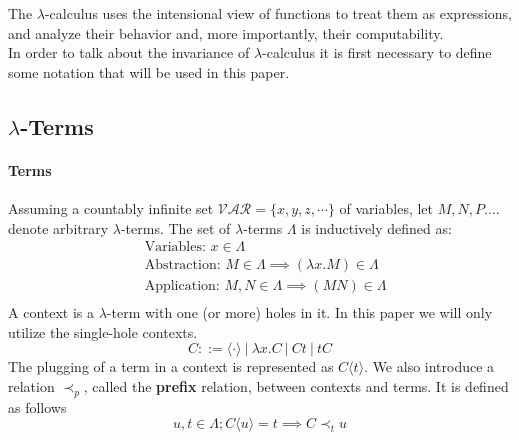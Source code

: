 \documentclass[11pt]{article}
\begin{document}
The $\lambda$-calculus uses the intensional view of functions to treat them as expressions, and analyze their behavior and, more importantly, their computability. \\
In order to talk about the invariance of $\lambda$-calculus it is first necessary to define some notation that will be used in this paper.
\subsection{$\lambda$-Terms}
\paragraph{Terms} Assuming a countably infinite set $\mathcal{VAR} = \{ x, y, z, \cdots \}$ of variables, let $M, N, P....$ denote arbitrary $\lambda$-terms. The set of $\lambda$-terms $\Lambda$ is inductively defined as:
\begin{equation*}
  \begin{split}
  & \text{Variables: } x \in \Lambda \\
  & \text{Abstraction: } M \in \Lambda \implies ( \lambda x.M ) \in \Lambda \\
  & \text{Application: } M, N \in \Lambda \implies (M N) \in \Lambda \\
  \end{split}
\end{equation*}
A context is a $\lambda$-term with one (or more) holes in it. In this paper we will only utilize the single-hole contexts.
\begin{equation*}
C ::= \langle \cdot \rangle \ | \ \lambda x.C \ | \ Ct \ | \ tC
\end{equation*}
The plugging of a term in a context is represented as $C\langle t \rangle$.
We also introduce a relation $\prec_p$, called the \textbf{prefix} relation, between contexts and terms. It is defined as follows
\begin{equation*}
  u,t \in \Lambda ; C \langle u \rangle = t \implies C \prec_t u
\end{equation*}
\end{document}

